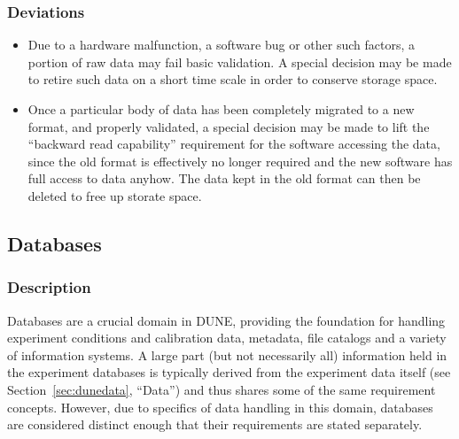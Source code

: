 \subsubsection{Deviations}
\begin{itemize}
\item Due to a hardware malfunction, a software bug or other such factors, a portion of raw data may fail basic validation.
A special decision may be made to retire such data on a short time scale in order to conserve storage space.

\item Once a particular body of data has been completely migrated to a new format, and properly validated,
a special decision may be made to lift the ``backward read capability'' requirement for the software accessing
the data, since the old format is effectively no longer required and the new software has full access to data anyhow.
The data kept in the old format can then be deleted to free up storate space.
\end{itemize}

\newpage
\subsection{Databases}
\label{sec:dunedb}
\subsubsection{Description}

Databases are a crucial domain in DUNE, providing the foundation for handling experiment conditions and calibration data,
metadata, file catalogs and a variety of information systems.  A large part (but not necessarily all) information held
in the experiment databases is typically derived from the experiment data itself (see  Section~\ref{sec:dunedata}, ``Data'')
and thus shares some of the same requirement concepts.  However, due to specifics of data handling in this domain, databases
are considered distinct enough that their requirements are stated separately.  

